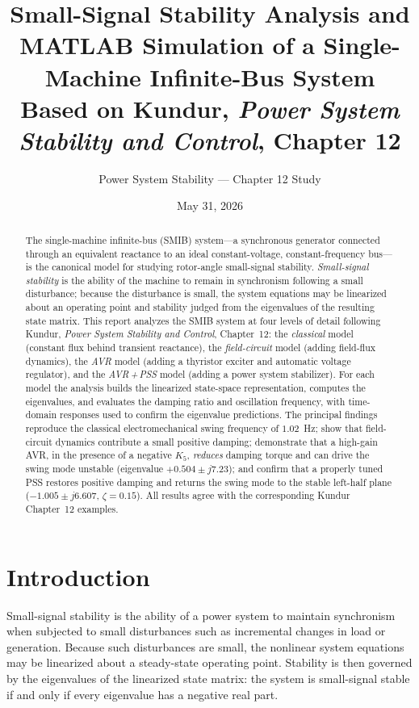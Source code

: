 \documentclass[12pt,a4paper]{article}
\title{\textbf{Small-Signal Stability Analysis and MATLAB
Simulation of a Single-Machine Infinite-Bus System}\\
\large Based on Kundur, \textit{Power System Stability and Control}, Chapter 12}
\author{Power System Stability --- Chapter 12 Study}
\date{May 31, 2026}
\begin{document}
\maketitle
\thispagestyle{empty}

\begin{abstract}
The single-machine infinite-bus (SMIB) system---a synchronous generator
connected through an equivalent reactance to an ideal constant-voltage,
constant-frequency bus---is the canonical model for studying rotor-angle
small-signal stability. \emph{Small-signal stability} is the ability of the
machine to remain in synchronism following a small disturbance; because the
disturbance is small, the system equations may be linearized about an operating
point and stability judged from the eigenvalues of the resulting state matrix.
This report analyzes the SMIB system at four levels of detail following Kundur,
\textit{Power System Stability and Control}, Chapter~12: the \emph{classical}
model (constant flux behind transient reactance), the \emph{field-circuit}
model (adding field-flux dynamics), the \emph{AVR} model (adding a thyristor
exciter and automatic voltage regulator), and the \emph{AVR\,+\,PSS} model
(adding a power system stabilizer). For each model the analysis builds the
linearized state-space representation, computes the eigenvalues, and evaluates
the damping ratio and oscillation frequency, with time-domain responses used to
confirm the eigenvalue predictions. The principal findings reproduce the
classical electromechanical swing frequency of $1.02$~Hz; show that
field-circuit dynamics contribute a small positive damping; demonstrate that a
high-gain AVR, in the presence of a negative $K_5$, \emph{reduces} damping
torque and can drive the swing mode unstable (eigenvalue $+0.504\pm j7.23$); and
confirm that a properly tuned PSS restores positive damping and returns the
swing mode to the stable left-half plane ($-1.005\pm j6.607$, $\zeta=0.15$). All
results agree with the corresponding Kundur Chapter~12 examples.
\end{abstract}
\newpage
\tableofcontents
\newpage

\section{Introduction}

Small-signal stability is the ability of a power system to maintain synchronism
when subjected to small disturbances such as incremental changes in load or
generation. Because such disturbances are small, the nonlinear system equations
may be linearized about a steady-state operating point. Stability is then
governed by the eigenvalues of the linearized state matrix: the system is
small-signal stable if and only if every eigenvalue has a negative real part.
\end{document}
